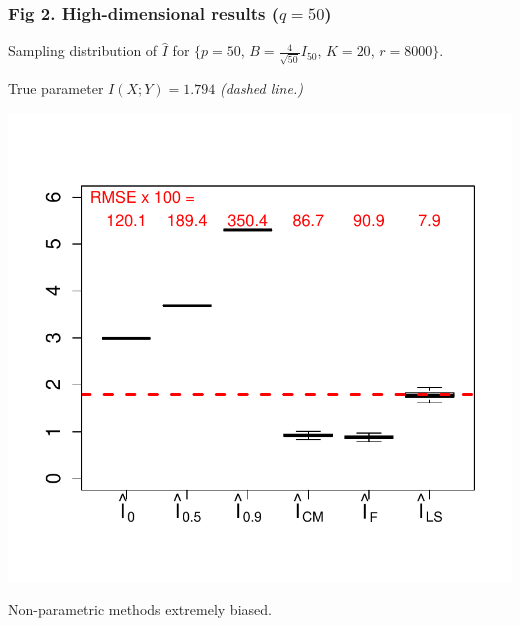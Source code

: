 \documentclass{beamer}
\begin{document}
\begin{frame}
\frametitle{Fig 2. High-dimensional results ($q = 50$)}
Sampling distribution of $\hat{I}$ for \small{$\{p = 50$, $B = \frac{4}{\sqrt{50}} I_{50}$, $K = 20$, $r = 8000\}$.}

True parameter $I(X; Y) = 1.794$ \emph{(dashed line.)}
\begin{center}
\includegraphics[scale = 0.5, clip = true, trim = 0 0.5in 0 0.5in]{../info_theory_sims/fig2.pdf}
\end{center}
Non-parametric methods extremely biased.
\end{frame}
\end{document}
